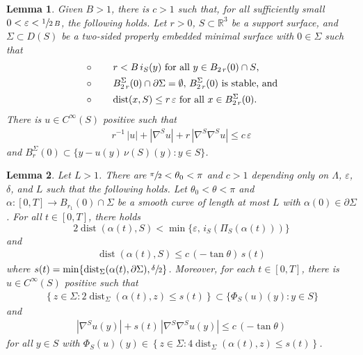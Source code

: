 \documentclass[10pt,a4paper]{amsart}
\newtheorem{lem}{Lemma}
\begin{document}
\begin{lem} \label{slab lemma}
Given $B>1$, there is $c>1$ such that, for all sufficiently small $0<\varepsilon<\sfrac{1}{2\,B}$, the following holds.  Let $r>0$, $S\subset \mathbb{R}^3$ be a support surface,   
 and $\Sigma\subset D(S)$ be a two-sided properly embedded minimal surface with $0\in \Sigma$ such that
 \begin{align}
 	&\circ\qquad r<B\,i_S(y)\text{ for all $y\in B_{2\,r}(0)\cap S$,} \notag \\
 	&\circ \qquad \text{$B^\Sigma_{2\,r}(0)\cap \partial \Sigma=\emptyset,$   $B^\Sigma_{2\,r}(0)$ is stable, and}\notag \\
 	&\circ\qquad  \operatorname{dist}(x,S)\leq r\,\varepsilon \text{  for all $x\in B^\Sigma_{2\,r}(0)$.}\notag 
 \end{align}
   There is   $u\in C^\infty(S)$ positive such that 
\begin{align*} 
r^{-1}\,|u|+|\nabla^S u|+r\,|\nabla^S\nabla^Su|\leq c\,\varepsilon
\end{align*} 
and $B^\Sigma_{r}(0)\subset \{y-u(y)\,\nu(S)(y):y\in S\}$.\end{lem} 

	\begin{lem}\label{harnack iteration}
Let   $L>1$.  There are $\sfrac{\pi}2<\theta_0<\pi$ and $c>1$ depending only on $\Lambda$, $\varepsilon$, $\delta$,  and $L$ such that the following holds. Let $\theta_0<\theta<\pi$ and
  $\alpha:[0,T]\to B_{r_1}(0)\cap\Sigma$ be a smooth curve of length at most $L$ with $\alpha(0)\in \partial \Sigma$. For all $t\in[0,T]$, there holds $$2\operatorname{dist}(\alpha(t),S)<\min\{\varepsilon,\,i_S(\Pi_S(\alpha(t)))\}$$ and 
\begin{align} \label{conclusion} 
\operatorname{dist}(\alpha(t),S)\leq c\,(-\tan\theta)\,s(t)
\end{align} 
where $s(t)=\min\{\operatorname{dist}_\Sigma(\alpha(t),\partial \Sigma),\sfrac{\delta}2\}$.
Moreover, for each $t\in[0,T]$, there is  $u\in C^\infty(S)$ positive such that
\begin{align} \label{graph concl 1}
\left\{z\in \Sigma:2\operatorname{dist}_\Sigma(\alpha(t),z)\leq s(t)\right\}\subset \{\Phi_S(u)(y):y\in S\}
\end{align} and
\begin{align} \label{graph concl2}
	|\nabla^Su(y)|+s(t)\,|\nabla^S\nabla^Su(y)|\leq c\,(-\tan\theta)
\end{align}
for all $y\in S$ with $\Phi_S(u)(y)\in \left\{z\in \Sigma:4\operatorname{dist}_\Sigma(\alpha(t),z)\leq s(t)\right\}$.
	\end{lem} 
\end{document}
